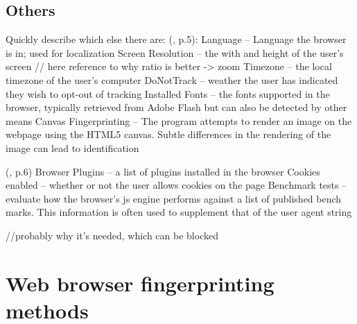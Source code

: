 \subsection{Others}
Quickly describe which else there are:
(\textcite{havens16}, p.5):
Language – Language the browser is in; used for localization
Screen Resolution – the with and height of the user’s screen
// here reference to why ratio is better -> zoom
Timezone – the local timezone of the user’s computer
DoNotTrack – weather the user has indicated they wish to opt-out of tracking
Installed Fonts – the fonts supported in the browser, typically retrieved from Adobe Flash but can also be detected by other means
Canvas Fingerprinting – The program attempts to render an image on the webpage using the HTML5 canvas. Subtle differences in the rendering of the image can lead to identification

(\textcite{havens16}, p.6)
Browser Plugins – a list of plugins installed in the browser
Cookies enabled – whether or not the user allows cookies on the page
Benchmark tests – evaluate how the browser’s js engine performs against a list of published bench marks. This information is often used to supplement that of the user agent string

//probably why it's needed, which can be blocked


\newpage
\section{Web browser fingerprinting methods}
%
%


